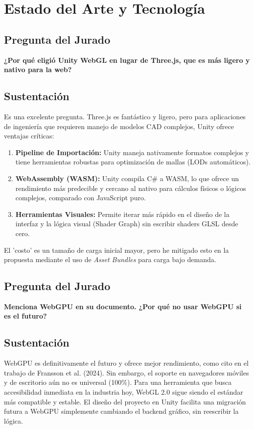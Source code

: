 \documentclass[11pt]{article}
\begin{document}
\section{Estado del Arte y Tecnología}

\subsection*{Pregunta del Jurado}
\textbf{¿Por qué eligió Unity WebGL en lugar de Three.js, que es más ligero y nativo para la web?}

\subsection*{Sustentación}
Es una excelente pregunta. Three.js es fantástico y ligero, pero para aplicaciones de ingeniería que requieren manejo de modelos CAD complejos, Unity ofrece ventajas críticas:

\begin{enumerate}
\item \textbf{Pipeline de Importación:} Unity maneja nativamente formatos complejos y tiene herramientas robustas para optimización de mallas (LODs automáticos).
\item \textbf{WebAssembly (WASM):} Unity compila C\# a WASM, lo que ofrece un rendimiento más predecible y cercano al nativo para cálculos físicos o lógicos complejos, comparado con JavaScript puro.
\item \textbf{Herramientas Visuales:} Permite iterar más rápido en el diseño de la interfaz y la lógica visual (Shader Graph) sin escribir shaders GLSL desde cero.
\end{enumerate}

El 'costo' es un tamaño de carga inicial mayor, pero he mitigado esto en la propuesta mediante el uso de \textit{Asset Bundles} para carga bajo demanda.

\subsection*{Pregunta del Jurado}
\textbf{Menciona WebGPU en su documento. ¿Por qué no usar WebGPU si es el futuro?}

\subsection*{Sustentación}
WebGPU es definitivamente el futuro y ofrece mejor rendimiento, como cito en el trabajo de Fransson et al. (2024). Sin embargo, el soporte en navegadores móviles y de escritorio aún no es universal (100\%). Para una herramienta que busca accesibilidad inmediata en la industria hoy, WebGL 2.0 sigue siendo el estándar más compatible y estable. El diseño del proyecto en Unity facilita una migración futura a WebGPU simplemente cambiando el backend gráfico, sin reescribir la lógica.
\end{document}

